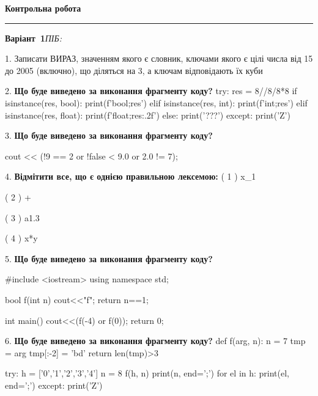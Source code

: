 \documentclass[11pt]{article}
\begin{document}
{\centering\Large\bfseries Контрольна робота\par}
\medskip
\noindent\rule{\linewidth}{0.5pt}
\smallskip
\noindent\textbf{Варіант \No\,1}\hfill \textit{ПІБ:}\,\underline{\hspace{60mm}}
\vspace{4mm}

1. 
Записати ВИРАЗ, значенням якого є словник, ключами якого є цілі числа від 15 до 2005 (включно), що діляться на 3, а ключам відповідають їх куби \par\vspace{5mm}

2. \textbf{Що буде виведено за виконання фрагменту коду?}
try:
    res = 8//8/8*8
    if isinstance(res, bool):
        print(f'bool;{res}')
    elif isinstance(res, int):
        print(f'int;{res}')
    elif isinstance(res, float):
        print(f'float;{res:.2f}')
    else:
        print('???')
except:
    print('Z')
\par\vspace{5mm}

3. \textbf{Що буде виведено за виконання фрагменту коду?}

cout << (!9 == 2 or !false < 9.0 or 2.0 != 7);
\par\vspace{5mm}

4. %
\textbf{Відмітити все, що є однією правильною лексемою:}
( 1 ) x_1

( 2 ) +

( 3 ) a1.3

( 4 ) x*y
\par\vspace{5mm}

5. \textbf{Що буде виведено за виконання фрагменту коду?}

#include <iostream>
using namespace std;

bool f(int n){
    cout<<"f";
    return n==1;
}

int main(){
    cout<<(f(-4) or f(0));
    return 0;
}
\par\vspace{5mm}

6. \textbf{Що буде виведено за виконання фрагменту коду?}
def f(arg, n):
    n = 7
    tmp = arg
    tmp[:-2] = 'bd'
    return len(tmp)>3

try:
    h = ['0','1','2','3','4']
    n = 8
    f(h, n)
    print(n, end=';')
    for el in h:
        print(el, end=';')
except:
    print('Z')
\par\vspace{5mm}
\end{document}
